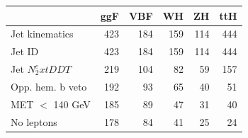 \begin{tabular}{lrrrrr}
\toprule
 & ggF & VBF & WH & ZH & ttH \\
\midrule
Jet kinematics & 423 & 184 & 159 & 114 & 444 \\
Jet ID & 423 & 184 & 159 & 114 & 444 \\
Jet $N_2^	ext{DDT}$ & 219 & 104 & 82 & 59 & 157 \\
Opp. hem. b veto & 192 & 93 & 65 & 40 & 51 \\
MET $<$ 140 GeV & 185 & 89 & 47 & 31 & 40 \\
No leptons & 178 & 84 & 41 & 25 & 24 \\
\bottomrule
\end{tabular}
